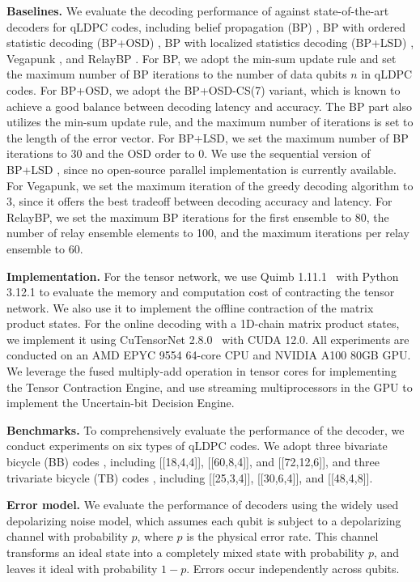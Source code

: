 \textbf{Baselines.}
We evaluate the decoding performance of \papername against state-of-the-art decoders for qLDPC codes, including belief propagation (BP) \cite{bp}, BP with ordered statistic decoding (BP+OSD) \cite{bposd}, BP with localized statistics decoding (BP+LSD) \cite{bplsd}, Vegapunk \cite{zhou2025vegapunk}, and RelayBP \cite{relaybp}.
For BP, we adopt the min-sum update rule and set the maximum number of BP iterations to the number of data qubits $n$ in qLDPC codes.
For BP+OSD, we adopt the BP+OSD-CS(7) variant, which is known to achieve a good balance between decoding latency and accuracy. The BP part also utilizes the min-sum update rule, and the maximum number of iterations is set to the length of the error vector.
For BP+LSD, we set the maximum number of BP iterations to 30 and the OSD order to 0. We use the sequential version of BP+LSD \cite{Roffe_LDPC_Python_tools_2022}, since no open-source parallel implementation is currently available.
For Vegapunk, we set the maximum iteration of the greedy decoding algorithm to 3, since it offers the best tradeoff between decoding accuracy and latency.
For RelayBP, we set the maximum BP iterations for the first ensemble to 80, the number of relay ensemble elements to 100, and the maximum iterations per relay ensemble to 60.

\textbf{Implementation.}
For the tensor network, we use Quimb 1.11.1~\cite{gray2018quimb} with Python 3.12.1 to evaluate the memory and computation cost of contracting the tensor network. We also use it to implement the offline contraction of the matrix product states. For the online decoding with a 1D-chain matrix product states, we implement it using CuTensorNet 2.8.0~\cite{cuQuantum} with CUDA 12.0. All experiments are conducted on an AMD EPYC 9554 64-core CPU and NVIDIA
A100 80GB GPU. We leverage the fused multiply-add operation in tensor cores for implementing the Tensor Contraction Engine, and use streaming multiprocessors in the GPU to implement the Uncertain-bit Decision Engine.

\textbf{Benchmarks.}
To comprehensively evaluate the performance of the decoder, we conduct experiments on six types of qLDPC codes. We adopt three bivariate bicycle (BB) codes \cite{bbcode}, including [[18,4,4]], [[60,8,4]], and [[72,12,6]], and three trivariate bicycle (TB) codes \cite{voss2025multivariate}, including [[25,3,4]], [[30,6,4]], and [[48,4,8]].

\textbf{Error model.}
We evaluate the performance of decoders using the widely used depolarizing noise model, which assumes each qubit is subject to a depolarizing channel with probability $p$, where $p$ is the physical error rate. This channel transforms an ideal state into a completely mixed state with probability $p$, and leaves it ideal with probability $1-p$. Errors occur independently across qubits.

